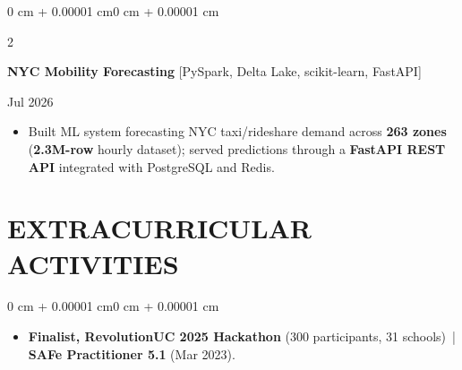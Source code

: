 \documentclass[10pt, letterpaper]{article}
\newenvironment{highlights}{
    \begin{itemize}[
        topsep=0.10 cm,
        parsep=0.06 cm,
        partopsep=0pt,
        itemsep=0.06 cm,
        leftmargin=12pt
    ]
}{
    \end{itemize}
}
\newenvironment{onecolentry}{
    \begin{adjustwidth}{0 cm + 0.00001 cm}{0 cm + 0.00001 cm}
}{
    \end{adjustwidth}
}
\newenvironment{twocolentry}[2][]{
    \onecolentry
    \def\secondColumn{#2}
    \setcolumnwidth{\fill, 4.5 cm}
    \begin{paracol}{2}
}{
    \switchcolumn \raggedleft \secondColumn
    \end{paracol}
    \endonecolentry
}
\begin{document}
\vspace{0.12 cm}

\begin{twocolentry}{Jul 2026}
\textbf{NYC Mobility Forecasting} [PySpark, Delta Lake, scikit-learn, FastAPI]
\end{twocolentry}
\begin{highlights}
  \item Built ML system forecasting NYC taxi/rideshare demand across \textbf{263 zones} (\textbf{2.3M-row} hourly dataset); served predictions through a \textbf{FastAPI REST API} integrated with PostgreSQL and Redis.
\end{highlights}

\section{EXTRACURRICULAR ACTIVITIES}
\begin{onecolentry}
\begin{highlights}
  \item \textbf{Finalist, RevolutionUC 2025 Hackathon} (300 participants, 31 schools) \,|\, \textbf{SAFe Practitioner 5.1} (Mar 2023).
\end{highlights}
\end{onecolentry}
\end{document}
